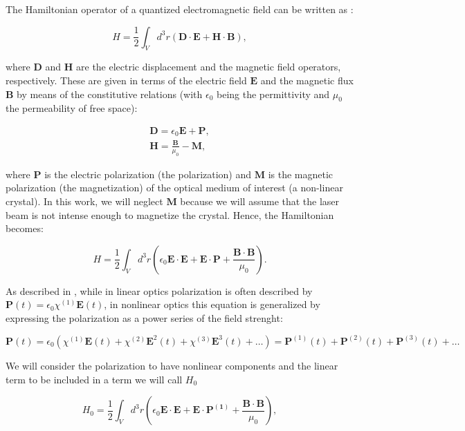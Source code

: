 \documentclass[12pt]{book}
\begin{document}
The Hamiltonian operator of a quantized electromagnetic field can be written as \cite{jackson}:

\begin{equation}
H=\frac{1}{2}\int_{V} d^{3}r (\mathbf{D \cdot E}+\mathbf{H \cdot B}),
\end{equation}

where $\textbf{D}$ and $\textbf{H}$ are the electric displacement and the magnetic field operators, respectively. These are given in terms of the electric field $\textbf{E}$ and the magnetic flux $\textbf{B}$ by means of the constitutive relations (with $\epsilon_{0} $ being the permittivity and $\mu_{0}$ the permeability of free space):


\begin{align}
\textbf{D}= \epsilon_{0} \textbf{E}+\textbf{P},\\
\textbf{H}=\frac{\textbf{B}}{\mu_{0}}-\textbf{M},
\end{align}

where $\mathbf{P}$ is the electric polarization (the polarization) and $\mathbf{M}$ is the magnetic polarization (the magnetization) of the optical medium of interest (a non-linear crystal). In this work, we will neglect $\textbf{M}$ because we will assume that the laser beam is not intense enough to magnetize the crystal. Hence, the Hamiltonian becomes:

\begin{equation}
H=\frac{1}{2}\int_{V} d^{3}r \left(\epsilon_{0}\mathbf{E \cdot E}+\mathbf{E \cdot P}+\frac{\mathbf{B \cdot B}}{\mu_{0}} \right).
\end{equation}


As described in \cite{boyd}, while in linear optics polarization is often described by $\mathbf{P}(t)=\epsilon_{0} \chi^{(1)}\mathbf{E}(t)$, in nonlinear optics this equation is generalized by expressing the polarization as a power series of the field strenght:

\begin{equation}
\mathbf{P}(t)=\epsilon_{0} \left( \chi^{(1)}\mathbf{E}(t)+\chi^{(2)}\mathbf{E}^{2}(t)+\chi^{(3)}\mathbf{E}^{3}(t)+ \dots \right)=\mathbf{P}^{(1)}(t)+\mathbf{P}^{(2)}(t)+\mathbf{P}^{(3)}(t)+ \dots
\end{equation}

 We will consider the polarization to have nonlinear components and the linear term to be included in a term we will call $H_{0}$
 
\begin{equation}
 H_{0}=\frac{1}{2}\int_{V} d^{3}r \left(\epsilon_{0}\mathbf{E \cdot E}+\mathbf{E} \cdot \mathbf{P^{(1)}}+\frac{\mathbf{B \cdot B}}{\mu_{0}} \right),
\end{equation}
\end{document}
